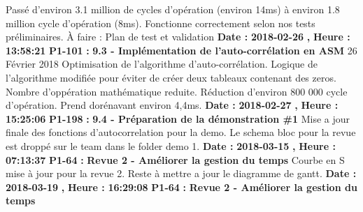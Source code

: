 \documentclass{article}%
\begin{document}
Passé d'environ 3.1 million de cycles d'opération (environ 14ms) à environ 1.8 million cycle d'opération (8ms).\newline%
Fonctionne correctement selon nos tests préliminaires.\newline%
À faire : Plan de test et validation\newline%
\newline%
%
\textbf{Date : }%
\textbf{2018{-}02{-}26}%
\textbf{,}%
\textbf{ Heure : }%
\textbf{13:58:21}%
\newline%
%
\textbf{P1{-}101 }%
\textbf{ : }%
\textbf{ 9.3 {-} Implémentation de l'auto{-}corrélation en ASM}%
\newline%
\newline%
%
26 Février 2018\newline%
Optimisation de l'algorithme d'auto{-}corrélation. Logique de l'algorithme modifiée pour éviter de créer deux tableaux contenant des zeros. Nombre d'oppération mathématique reduite.\newline%
Réduction d'environ 800 000 cycle d'opération. Prend dorénavant environ 4,4ms.\newline%
\newline%
%
\textbf{Date : }%
\textbf{2018{-}02{-}27}%
\textbf{,}%
\textbf{ Heure : }%
\textbf{15:25:06}%
\newline%
%
\textbf{P1{-}198 }%
\textbf{ : }%
\textbf{ 9.4 {-} Préparation de la démonstration \#1}%
\newline%
\newline%
%
Mise a jour finale des fonctions d'autocorrelation pour la demo. Le schema bloc pour la revue est droppé sur le team dans le folder demo 1.\newline%
\newline%
%
\textbf{Date : }%
\textbf{2018{-}03{-}15}%
\textbf{,}%
\textbf{ Heure : }%
\textbf{07:13:37}%
\newline%
%
\textbf{P1{-}64 }%
\textbf{ : }%
\textbf{ Revue 2 {-} Améliorer la gestion du temps}%
\newline%
\newline%
%
Courbe en S mise à jour pour la revue 2. Reste à mettre a jour le diagramme de gantt.\newline%
\newline%
%
\textbf{Date : }%
\textbf{2018{-}03{-}19}%
\textbf{,}%
\textbf{ Heure : }%
\textbf{16:29:08}%
\newline%
%
\textbf{P1{-}64 }%
\textbf{ : }%
\textbf{ Revue 2 {-} Améliorer la gestion du temps}%
\newline%
\end{document}
